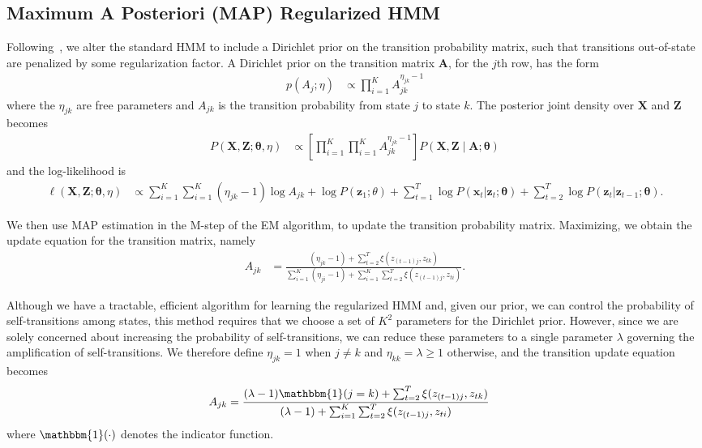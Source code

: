 \documentclass[12pt]{article}
\begin{document}
\subsection{Maximum A Posteriori (MAP) Regularized HMM}

Following~\cite{MAP1994}, we alter the standard HMM to include a Dirichlet prior on the transition probability matrix, such that transitions out-of-state are penalized by some regularization factor. A Dirichlet prior on the transition matrix $\mathbf{A}$, for the $j$th row, has the form
\begin{align*}
    p(A_j; \eta) &\propto \prod_{i=1}^{K} A_{jk}^{\eta_{jk}-1}
\end{align*}
where the $\eta_{jk}$ are free parameters and $A_{jk}$ is the transition probability from state $j$ to state $k$. The posterior joint density over $\mathbf{X}$ and $\mathbf{Z}$ becomes
\begin{align*}
    P(\mathbf{X}, \mathbf{Z} ; \mathbf{\theta}, \eta) 
    &\propto \left[\prod_{i=1}^{K}\prod_{i=1}^{K} A_{jk}^{\eta_{jk} - 1}\right] P(\mathbf{X}, \mathbf{Z} \mid \mathbf{A}; \mathbf{\theta}) 
\end{align*}
and the log-likelihood is
\begin{align*}
\ell(\mathbf{X}, \mathbf{Z} ; \mathbf{\theta}, \eta) 
&\propto \sum_{i=1}^{K}\sum_{i=1}^{K} (\eta_{jk} - 1)\log A_{jk} + \log P(\mathbf{z}_{1}; \theta) + \sum_{t=1}^{T}\log P(\mathbf{x}_t|\mathbf{z}_t; \mathbf{\theta}) + \sum_{t=2}^{T}\log P(\mathbf{z}_t|\mathbf{z}_{t-1}; \mathbf{\theta}).
\end{align*}

We then use MAP estimation in the M-step of the EM algorithm, to update the transition probability matrix. Maximizing, we obtain the update equation for the transition matrix, namely
\begin{align*}
    A_{jk} &= \frac{(\eta_{jk} - 1) + \sum_{t=2}^{T} \xi(z_{(t-1)j}, z_{tk})}   
    {\sum_{i=1}^{K}(\eta_{ji} - 1) + \sum_{i=1}^{K}\sum_{t=2}^{T} \xi(z_{(t-1)j}, z_{ti})}.
\end{align*}

Although we have a tractable, efficient algorithm for learning the regularized HMM and, given our prior, we can control the probability of self-transitions among states, this method requires that we choose a set of $K^2$ parameters for the Dirichlet prior. However, since we are solely concerned about increasing the probability of self-transitions, we can reduce these parameters to a single parameter $\lambda$ governing the amplification of self-transitions. We therefore define $\eta_{jk} = 1$ when $j\not=k$ and $\eta_{kk}= \lambda \geq 1$ otherwise, and the transition update equation becomes
\begin{align*}
    A_{jk} &= \frac{(\lambda - 1){\mathbbm{1}(j = k)} + \sum_{t=2}^{T} \xi(z_{(t-1)j}, z_{tk})}   
    {(\lambda - 1) + \sum_{i=1}^{K}\sum_{t=2}^{T} \xi(z_{(t-1)j}, z_{ti})}
\end{align*}
where $\mathbbm{1}(\cdot)$ denotes the indicator function.
\end{document}
